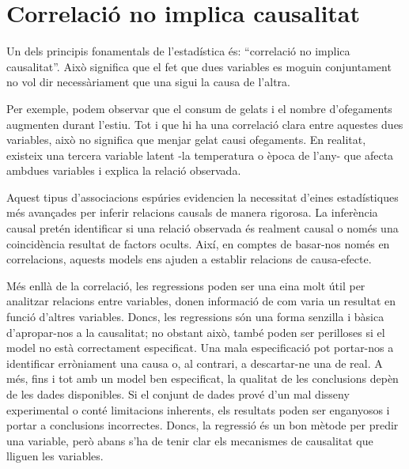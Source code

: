 \documentclass[../main.tex]{subfiles}
\begin{document}
    \section{Correlació no implica causalitat}\label{sec:cor_no_causalitat}
    Un dels principis fonamentals de l’estadística és: “correlació no implica causalitat”. Això significa que el fet que dues variables es moguin conjuntament no vol dir necessàriament que una sigui la causa de l’altra. \par
    Per exemple, podem observar que el consum de gelats i el nombre d’ofegaments augmenten durant l’estiu. Tot i que hi ha una correlació clara entre aquestes dues variables, això no significa que menjar gelat causi ofegaments. En realitat, existeix una tercera variable latent -la temperatura o època de l'any- que afecta ambdues variables i explica la relació observada.\par
    Aquest tipus d’associacions espúries evidencien la necessitat d’eines estadístiques més avançades per inferir relacions causals de manera rigorosa. La inferència causal pretén identificar si una relació observada és realment causal o només una coincidència resultat de factors ocults. Així, en comptes de basar-nos només en correlacions, aquests models ens ajuden a establir relacions de causa-efecte.\par
    Més enllà de la correlació, les regressions poden ser una eina molt útil per analitzar relacions entre variables, donen informació de com varia un resultat en funció d’altres variables. Doncs, les regressions són una forma senzilla i bàsica d’apropar-nos a la causalitat; no obstant això, també poden ser perilloses si el model no està correctament especificat. Una mala especificació pot portar-nos a identificar erròniament una causa o, al contrari, a descartar-ne una de real. A més, fins i tot amb un model ben especificat, la qualitat de les conclusions depèn de les dades disponibles. Si el conjunt de dades prové d’un mal disseny experimental o conté limitacions inherents, els resultats poden ser enganyosos i portar a conclusions incorrectes. Doncs, la regressió és un bon mètode per predir una variable, però abans s’ha de tenir clar els mecanismes de causalitat que lliguen les variables.
\end{document}
